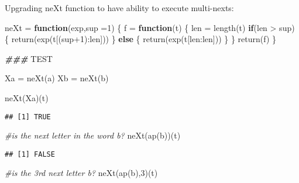 \documentclass[
]{article}
\newenvironment{Shaded}{\begin{snugshade}}{\end{snugshade}}
\newcommand{\AlertTok}[1]{\textcolor[rgb]{0.94,0.16,0.16}{#1}}
\newcommand{\AttributeTok}[1]{\textcolor[rgb]{0.77,0.63,0.00}{#1}}
\newcommand{\CommentTok}[1]{\textcolor[rgb]{0.56,0.35,0.01}{\textit{#1}}}
\newcommand{\ControlFlowTok}[1]{\textcolor[rgb]{0.13,0.29,0.53}{\textbf{#1}}}
\newcommand{\DecValTok}[1]{\textcolor[rgb]{0.00,0.00,0.81}{#1}}
\newcommand{\DocumentationTok}[1]{\textcolor[rgb]{0.56,0.35,0.01}{\textbf{\textit{#1}}}}
\newcommand{\FunctionTok}[1]{\textcolor[rgb]{0.00,0.00,0.00}{#1}}
\newcommand{\NormalTok}[1]{#1}
\newcommand{\OtherTok}[1]{\textcolor[rgb]{0.56,0.35,0.01}{#1}}
\newcommand{\SpecialCharTok}[1]{\textcolor[rgb]{0.00,0.00,0.00}{#1}}
\newcommand{\StringTok}[1]{\textcolor[rgb]{0.31,0.60,0.02}{#1}}
\begin{document}
Upgrading neXt function to have ability to execute multi-nexts:

\begin{Shaded}
\begin{Highlighting}[]
\NormalTok{neXt }\OtherTok{=} \ControlFlowTok{function}\NormalTok{(exp,}\AttributeTok{sup =}\DecValTok{1}\NormalTok{)}
\NormalTok{\{}
\NormalTok{  f }\OtherTok{=} \ControlFlowTok{function}\NormalTok{(t)}
\NormalTok{  \{}
\NormalTok{    len }\OtherTok{=} \FunctionTok{length}\NormalTok{(t)}
    \ControlFlowTok{if}\NormalTok{(len }\SpecialCharTok{\textgreater{}}\NormalTok{ sup)}
\NormalTok{    \{}
      \FunctionTok{return}\NormalTok{(}\FunctionTok{exp}\NormalTok{(t[(sup}\SpecialCharTok{+}\DecValTok{1}\NormalTok{)}\SpecialCharTok{:}\NormalTok{len]))}
\NormalTok{    \}}
    \ControlFlowTok{else} 
\NormalTok{    \{}
      \FunctionTok{return}\NormalTok{(}\FunctionTok{exp}\NormalTok{(t[len}\SpecialCharTok{:}\NormalTok{len]))}
\NormalTok{    \}}
\NormalTok{  \}}
  \FunctionTok{return}\NormalTok{(f)}
\NormalTok{\}}

\DocumentationTok{\#\#\# }\AlertTok{TEST}

\NormalTok{Xa }\OtherTok{=} \FunctionTok{neXt}\NormalTok{(a)}
\NormalTok{Xb }\OtherTok{=} \FunctionTok{neXt}\NormalTok{(b)}

\FunctionTok{neXt}\NormalTok{(Xa)(t)}
\end{Highlighting}
\end{Shaded}

\begin{verbatim}
## [1] TRUE
\end{verbatim}

\begin{Shaded}
\begin{Highlighting}[]
\CommentTok{\#is the next letter in the word b? }
\FunctionTok{neXt}\NormalTok{(}\FunctionTok{ap}\NormalTok{(}\StringTok{\textquotesingle{}b\textquotesingle{}}\NormalTok{))(t)}
\end{Highlighting}
\end{Shaded}

\begin{verbatim}
## [1] FALSE
\end{verbatim}

\begin{Shaded}
\begin{Highlighting}[]
\CommentTok{\#is the 3rd next letter b? }
\FunctionTok{neXt}\NormalTok{(}\FunctionTok{ap}\NormalTok{(}\StringTok{\textquotesingle{}b\textquotesingle{}}\NormalTok{),}\DecValTok{3}\NormalTok{)(t)}
\end{Highlighting}
\end{Shaded}
\end{document}
